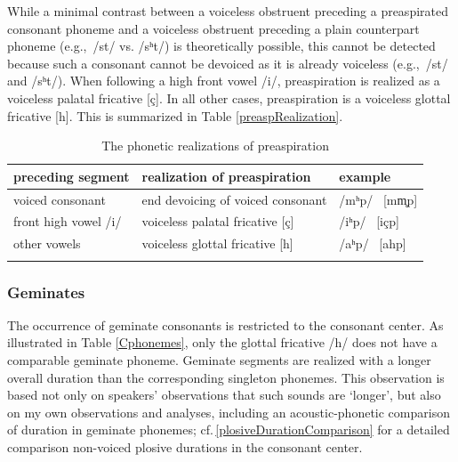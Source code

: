 While a minimal contrast between a voiceless obstruent preceding a preaspirated consonant phoneme and a voiceless obstruent preceding a plain counterpart phoneme (e.g.,~/st/ vs. /sʰt/) is theoretically possible, this cannot be detected because such a consonant cannot be devoiced as it is already voiceless (e.g.,~\mbox{/st/\ARROW [st]} and \mbox{/sʰt/\ARROW [st]}). %
When following a high front vowel /i/, preaspiration is realized as a voiceless palatal fricative [ç]. 
In all other cases, preaspiration is a voiceless glottal fricative [h]. This is summarized in Table \vref{preaspRealization}. %
\begin{table}[h]\centering
\caption{The phonetic realizations of preaspiration}\label{preaspRealization}
\begin{tabular}{lll}\mytoprule
{preceding segment}	& {realization of preaspiration}	&{example} \\\hline
voiced consonant		& end devoicing of voiced consonant &/mʰp/ \ARROW\ [mm̥p] \\%
front high vowel /i/		& voiceless palatal fricative [ç]	&/iʰp/ \ARROW\ [içp]\\%
other vowels			& voiceless glottal fricative [h]	&/aʰp/ \ARROW\ [ahp]\\\mybottomrule%
\end{tabular}
\end{table}


\subsubsection{Geminates}\label{geminateCs}
The occurrence of geminate consonants is restricted to the consonant center. %
As illustrated in Table \vref{Cphonemes}, only the glottal fricative /h/ does not have a comparable geminate phoneme. %
Geminate segments are realized with a longer overall duration than the corresponding singleton phonemes. This observation is based not only on speakers’ observations that such sounds are ‘longer’, but also on my own observations and analyses, including an acoustic-phonetic comparison of duration in geminate phonemes; cf.\,\SEC\ref{plosiveDurationComparison} for a detailed comparison non-voiced plosive durations in the consonant center. 

